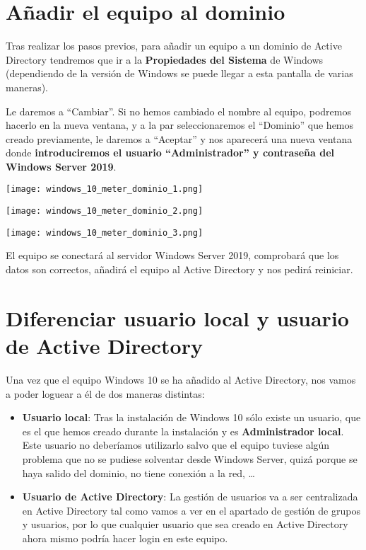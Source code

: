 \section{Añadir el equipo al dominio}
Tras realizar los pasos previos, para añadir un equipo a un dominio de Active Directory tendremos que ir a la \textbf{Propiedades del Sistema} de Windows (dependiendo de la versión de Windows se puede llegar a esta pantalla de varias maneras).

Le daremos a “Cambiar”. Si no hemos cambiado el nombre al equipo, podremos hacerlo en la nueva ventana, y a la par seleccionaremos el “Dominio” que hemos creado previamente, le daremos a “Aceptar” y nos aparecerá una nueva ventana donde \textbf{introduciremos el usuario “Administrador” y contraseña del Windows Server 2019}.

{
    \begin{minipage}{0.3\linewidth}
        \texttt{[image: windows\_10\_meter\_dominio\_1.png]}
    \end{minipage}
    \hfill
    \begin{minipage}{0.3\linewidth}
        \texttt{[image: windows\_10\_meter\_dominio\_2.png]}
    \end{minipage}
    \hfill
    \begin{minipage}{0.3\linewidth}
        \texttt{[image: windows\_10\_meter\_dominio\_3.png]}
    \end{minipage}
}

El equipo se conectará al servidor Windows Server 2019, comprobará que los datos son correctos, añadirá el equipo al Active Directory y nos pedirá reiniciar.


\section{Diferenciar usuario local y usuario de Active Directory}
Una vez que el equipo Windows 10 se ha añadido al Active Directory, nos vamos a poder loguear a él de dos maneras distintas:

\begin{itemize}
    \item \textbf{Usuario local}: Tras la instalación de Windows 10 sólo existe un usuario, que es el que hemos creado durante la instalación y es \textbf{Administrador local}. Este usuario no deberíamos utilizarlo salvo que el equipo tuviese algún problema que no se pudiese solventar desde Windows Server, quizá porque se haya salido del dominio, no tiene conexión a la red, …
    \item \textbf{Usuario de Active Directory}: La gestión de usuarios va a ser centralizada en Active Directory tal como vamos a ver en el apartado de gestión de grupos y usuarios, por lo que cualquier usuario que sea creado en Active Directory ahora mismo podría hacer login en este equipo.
\end{itemize}

